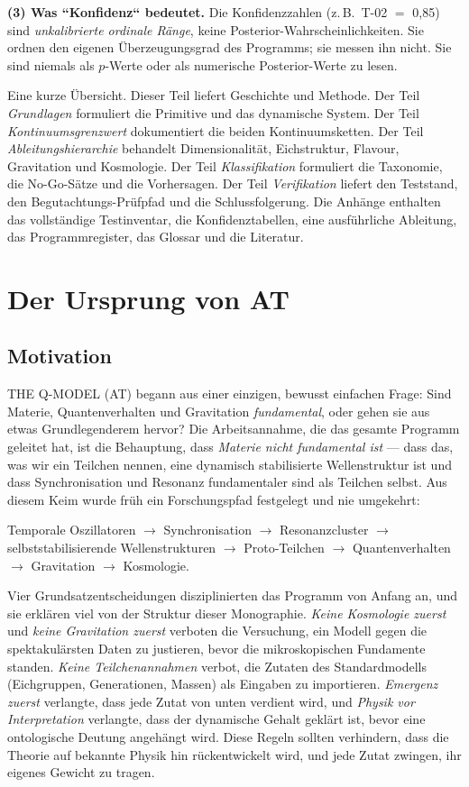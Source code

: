 \documentclass[10pt,twoside,openany]{book}
\begin{document}
\textbf{(3) Was ``Konfidenz`` bedeutet.} Die Konfidenzzahlen (z.\,B.\ T-02 $=$ 0{,}85) sind
\emph{unkalibrierte ordinale Ränge}, keine Posterior-Wahrscheinlichkeiten. Sie ordnen den
eigenen Überzeugungsgrad des Programms; sie messen ihn nicht. Sie sind niemals als
$p$-Werte oder als numerische Posterior-Werte zu lesen.

Eine kurze Übersicht. Dieser Teil liefert Geschichte und Methode. Der Teil
\emph{Grundlagen} formuliert die Primitive und das dynamische System. Der Teil
\emph{Kontinuumsgrenzwert} dokumentiert die beiden Kontinuumsketten. Der Teil
\emph{Ableitungshierarchie} behandelt Dimensionalität, Eichstruktur, Flavour, Gravitation
und Kosmologie. Der Teil \emph{Klassifikation} formuliert die Taxonomie, die No-Go-Sätze
und die Vorhersagen. Der Teil \emph{Verifikation} liefert den Teststand, den
Begutachtungs-Prüfpfad und die Schlussfolgerung. Die Anhänge enthalten das vollständige
Testinventar, die Konfidenztabellen, eine ausführliche Ableitung, das Programmregister,
das Glossar und die Literatur.

\chapter{Der Ursprung von AT}
\label{ch:origin}

\section{Motivation}

THE Q-MODEL (AT) begann aus einer einzigen, bewusst einfachen Frage: Sind Materie,
Quantenverhalten und Gravitation \emph{fundamental}, oder gehen sie aus etwas
Grundlegenderem hervor? Die Arbeitsannahme, die das gesamte Programm geleitet hat, ist die
Behauptung, dass \emph{Materie nicht fundamental ist} --- dass das, was wir ein Teilchen
nennen, eine dynamisch stabilisierte Wellenstruktur ist und dass Synchronisation und
Resonanz fundamentaler sind als Teilchen selbst. Aus diesem Keim wurde früh ein
Forschungspfad festgelegt und nie umgekehrt:

\begin{center}
Temporale Oszillatoren $\to$ Synchronisation $\to$ Resonanzcluster $\to$
selbststabilisierende Wellenstrukturen $\to$ Proto-Teilchen $\to$ Quantenverhalten $\to$
Gravitation $\to$ Kosmologie.
\end{center}

Vier Grundsatzentscheidungen disziplinierten das Programm von Anfang an, und sie erklären
viel von der Struktur dieser Monographie. \emph{Keine Kosmologie zuerst} und \emph{keine
Gravitation zuerst} verboten die Versuchung, ein Modell gegen die spektakulärsten Daten zu
justieren, bevor die mikroskopischen Fundamente standen. \emph{Keine
Teilchenannahmen} verbot, die Zutaten des Standardmodells (Eichgruppen, Generationen,
Massen) als Eingaben zu importieren. \emph{Emergenz zuerst} verlangte, dass jede Zutat von
unten verdient wird, und \emph{Physik vor Interpretation} verlangte, dass der dynamische
Gehalt geklärt ist, bevor eine ontologische Deutung angehängt wird. Diese Regeln sollten
verhindern, dass die Theorie auf bekannte Physik hin rückentwickelt wird, und jede Zutat
zwingen, ihr eigenes Gewicht zu tragen.
\end{document}
